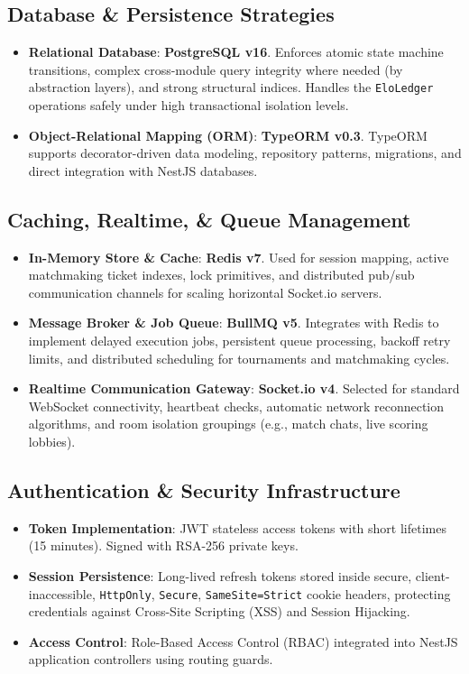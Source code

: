 \documentclass[11pt,a4paper]{report}
\begin{document}
\subsection{Database \& Persistence Strategies}
\begin{itemize}
    \item \textbf{Relational Database}: \textbf{PostgreSQL v16}. Enforces atomic state machine transitions, complex cross-module query integrity where needed (by abstraction layers), and strong structural indices. Handles the \texttt{EloLedger} operations safely under high transactional isolation levels.
    \item \textbf{Object-Relational Mapping (ORM)}: \textbf{TypeORM v0.3}. TypeORM supports decorator-driven data modeling, repository patterns, migrations, and direct integration with NestJS databases.
\end{itemize}

\subsection{Caching, Realtime, \& Queue Management}
\begin{itemize}
    \item \textbf{In-Memory Store \& Cache}: \textbf{Redis v7}. Used for session mapping, active matchmaking ticket indexes, lock primitives, and distributed pub/sub communication channels for scaling horizontal Socket.io servers.
    \item \textbf{Message Broker \& Job Queue}: \textbf{BullMQ v5}. Integrates with Redis to implement delayed execution jobs, persistent queue processing, backoff retry limits, and distributed scheduling for tournaments and matchmaking cycles.
    \item \textbf{Realtime Communication Gateway}: \textbf{Socket.io v4}. Selected for standard WebSocket connectivity, heartbeat checks, automatic network reconnection algorithms, and room isolation groupings (e.g., match chats, live scoring lobbies).
\end{itemize}

\subsection{Authentication \& Security Infrastructure}
\begin{itemize}
    \item \textbf{Token Implementation}: JWT stateless access tokens with short lifetimes (15 minutes). Signed with RSA-256 private keys.
    \item \textbf{Session Persistence}: Long-lived refresh tokens stored inside secure, client-inaccessible, \texttt{HttpOnly}, \texttt{Secure}, \texttt{SameSite=Strict} cookie headers, protecting credentials against Cross-Site Scripting (XSS) and Session Hijacking.
    \item \textbf{Access Control}: Role-Based Access Control (RBAC) integrated into NestJS application controllers using routing guards.
\end{itemize}
\end{document}
